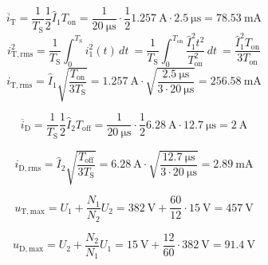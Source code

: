 \begin{solutionblock}
    \begin{equation}
        \overline{i}_\mathrm{T} = \frac{1}{T_\mathrm{S}}\frac{1}{2}\hat I_\mathrm{1}T_\mathrm{on}=\frac{1}{\SI{20}{\micro\s}}\cdot\frac{1}{2}\SI{1.257}{\ampere}\cdot\SI{2.5}{\micro\s}=\SI{78.53}{\milli\ampere}
    \end{equation}
    \begin{equation}
        i_\mathrm{T,rms}^2=\frac{1}{T_\mathrm{S}} \int_{0}^{T_\mathrm{S}} i_\mathrm{1}^2(t) \,dt \ = \frac{1}{T_\mathrm{S}}\int_{0}^{T_\mathrm{on}} \frac{\hat I_\mathrm{1}^2t^2}{T_\mathrm{on}^2} \,dt \ =  \frac{\hat I_\mathrm{1}^2T_\mathrm{on}}{3T_\mathrm{on}}
    \end{equation}
    \begin{equation}
        i_\mathrm{T,rms} = \hat I_\mathrm{1} \sqrt{\frac{T_\mathrm{on}}{3T_\mathrm{S}}}= \SI{1.257}{\ampere}\cdot\sqrt{\frac{\SI{2.5}{\micro\s}}{3\cdot\SI{20}{\micro\s}}}= \SI{256.58}{\milli\ampere}
    \end{equation}

    \begin{equation}
        \overline{i}_\mathrm{D} = \frac{1}{T_\mathrm{S}}\frac{1}{2}\hat I_\mathrm{2}T_\mathrm{off}=\frac{1}{\SI{20}{\micro\s}}\cdot\frac{1}{2}\SI{6.28}{\ampere}\cdot\SI{12.7}{\micro\s}=\SI{2}{\ampere}
    \end{equation}

    \begin{equation}
        i_\mathrm{D,rms} = \hat I_\mathrm{2} \sqrt{\frac{T_\mathrm{off}}{3T_\mathrm{S}}}= \SI{6.28}{\ampere}\cdot\sqrt{\frac{\SI{12.7}{\micro\s}}{3\cdot\SI{20}{\micro\s}}}= \SI{2.89}{\milli\ampere}
    \end{equation}

    \begin{equation}
        u_\mathrm{T,max} = U_\mathrm{1} + \frac{N_\mathrm{1}}{N_\mathrm{2}}U_\mathrm{2}= \SI{382}{\volt}+\frac{60}{12}\cdot\SI{15}{\volt}= \SI{457}{\volt}
    \end{equation}

    \begin{equation}
        u_\mathrm{D,max} = U_\mathrm{2} + \frac{N_\mathrm{2}}{N_\mathrm{1}}U_\mathrm{1}= \SI{15}{\volt}+\frac{12}{60}\cdot\SI{382}{\volt}= \SI{91.4}{\volt}
    \end{equation}

\end{solutionblock}


